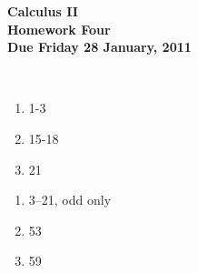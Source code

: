 \documentclass[12pt]{article}
\begin{document}
\pagestyle{empty}
 
\begin{center}
{\large {\bf Calculus II}}\\
\medskip
{\large {\bf Homework Four}}\\
\medskip
{ {\bf Due Friday 28 January, 2011}}\\
\end{center}
\hspace{2mm}\\



\begin{enumerate}
\setlength{\itemsep}{-1mm}
  \item 1-3
  \item 15-18
  \item 21
\end{enumerate}



\begin{enumerate}
\setlength{\itemsep}{-1mm}
  \item 3--21, odd only
  \item 53
  \item 59

\end{enumerate}

%


%
%


%
%
\end{document}
